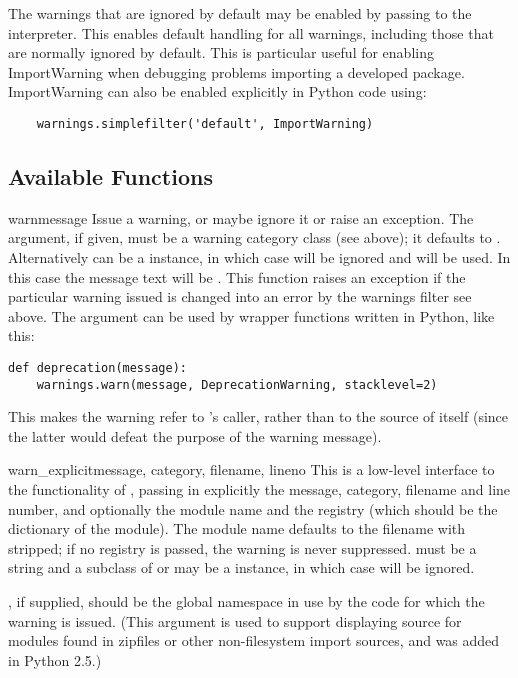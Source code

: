The warnings that are ignored by default may be enabled by passing
  to the interpreter. This enables default handling
for all warnings, including those that are normally ignored by
default. This is particular useful for enabling ImportWarning when
debugging problems importing a developed package. ImportWarning can
also be enabled explicitly in Python code using:

\begin{verbatim}
    warnings.simplefilter('default', ImportWarning)
\end{verbatim}


\subsection{Available Functions \label{warning-functions}}

\begin{funcdesc}{warn}{message}
Issue a warning, or maybe ignore it or raise an exception.  The
 argument, if given, must be a warning category class
(see above); it defaults to .  Alternatively
 can be a  instance, in which case
 will be ignored and  will be used.
In this case the message text will be . This function
raises an exception if the particular warning issued is changed
into an error by the warnings filter see above.  The 
argument can be used by wrapper functions written in Python, like
this:

\begin{verbatim}
def deprecation(message):
    warnings.warn(message, DeprecationWarning, stacklevel=2)
\end{verbatim}

This makes the warning refer to 's caller,
rather than to the source of  itself (since
the latter would defeat the purpose of the warning message).
\end{funcdesc}

\begin{funcdesc}{warn_explicit}{message, category, filename,
 lineno}
This is a low-level interface to the functionality of
, passing in explicitly the message, category,
filename and line number, and optionally the module name and the
registry (which should be the  dictionary of
the module).  The module name defaults to the filename with 
stripped; if no registry is passed, the warning is never suppressed.
 must be a string and  a subclass of
 or  may be a  instance,
in which case  will be ignored.

, if supplied, should be the global namespace in use
by the code for which the warning is issued.  (This argument is used to
support displaying source for modules found in zipfiles or other
non-filesystem import sources, and was added in Python 2.5.)
\end{funcdesc}

